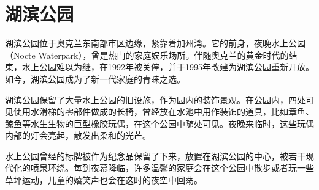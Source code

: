 \section{湖滨公园}

湖滨公园位于奥克兰东南部市区边缘，紧靠着加州湾。它的前身，夜晚水上公园（Nocte Waterpark），曾是热门的家庭娱乐场所。伴随奥克兰的黄金时代的结束，水上公园难以为继，在1992年被关停，并于1995年改建为湖滨公园重新开放。如今，湖滨公园成为了新一代家庭的青睐之选。

湖滨公园保留了大量水上公园的旧设施，作为园内的装饰景观。在公园内，四处可见使用水滑梯的零部件做成的长椅，曾经放在水池中用作装饰的道具，比如章鱼、鲸鱼等水生生物的巨型橡胶玩偶，在这个公园中随处可见。夜晚来临时，这些玩偶内部的灯会亮起，散发出柔和的光芒。

水上公园曾经的标牌被作为纪念品保留了下来，放置在湖滨公园的中心，被若干现代化的喷泉环绕。每到夜幕降临，许多温馨的家庭会在这个公园中散步或者玩一些草坪运动，儿童的嬉笑声也会在这时的夜空中回荡。